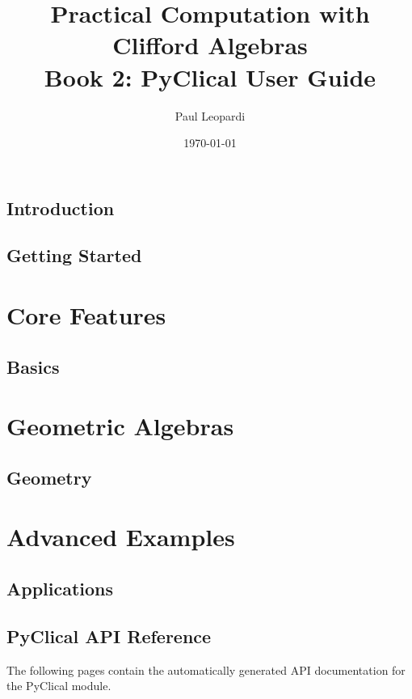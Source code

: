 \documentclass[a4paper,11pt]{book}
\title{Practical Computation with Clifford Algebras\\
\Large Book 2: PyClical User Guide}
\author{Paul Leopardi}
\date{\today}
\begin{document}
\frontmatter
\maketitle
\tableofcontents

\chapter{Introduction}


\chapter{Getting Started}


\mainmatter

\part{Core Features}
\chapter{Basics}


\part{Geometric Algebras}
\chapter{Geometry}


\part{Advanced Examples}
\chapter{Applications}


\backmatter
\appendix
\chapter{PyClical API Reference}
\label{ch:sphinx_ref}
The following pages contain the automatically generated API documentation for the PyClical module.

\end{document}
